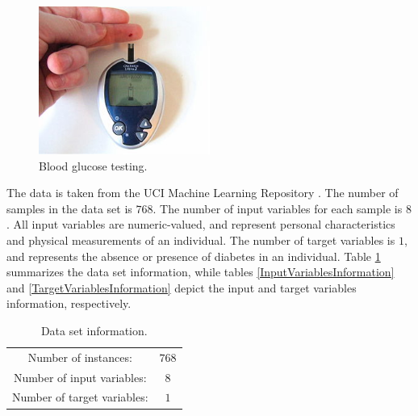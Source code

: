 \begin{figure}[!hbp]
\begin{center}
\includegraphics[width=0.5\textwidth]{pattern_recognition/blood_glucose_testing}
\caption{Blood glucose testing.}\label{BloodGlucoseTestingFigure}
\end{center}
\end{figure}


The data is taken from the UCI Machine Learning Repository
\cite{UCI}. The number of samples in the data set is $768$.
The number of input variables for each sample is $8$. All input
variables are numeric-valued, and represent personal
characteristics and physical measurements of an individual. The
number of target variables is $1$, and represents the absence or
presence of diabetes in an individual. Table
\ref{DataSetInformation} summarizes the 
data set information, while tables \ref{InputVariablesInformation}
and \ref{TargetVariablesInformation} depict the input and target
variables information, respectively.

\begin{table}[h!]
\begin{center}
\begin{tabular}{cc}
\hline
Number of instances: & $768$ \\
Number of input variables: & $8$ \\
Number of target variables: & $1$ \\
\hline
\end{tabular}\caption{Data set information.}\label{DataSetInformation}
\end{center}
\end{table}


